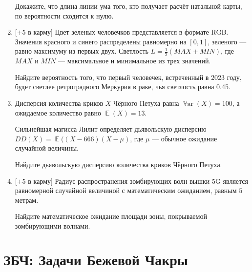 \documentclass[12pt]{article}
\DeclareMathOperator{\E}{\mathbb{E}}
\DeclareMathOperator{\Var}{\mathbb{V}ar}
\begin{document}
\begin{enumerate}
    Докажите, что  длина линии ума того, кто получает расчёт натальной карты, по вероятности сходится к нулю.
    
    
    \item  $[+$5 в карму] Цвет зеленых человечков представляется в формате RGB. 
    Значения красного и синего распределены равномерно на $[0,1]$, зеленого — равно максимуму из первых двух. Светлость $L = \frac 12 (MAX + MIN)$, где $MAX$ и $MIN$ — максимальное и минимальное из трех значений. 
    
    Найдите вероятность того, что первый человечек, встреченный в 2023 году, будет светлее рет\-рог\-рад\-ного Меркурия в раке, чья светлость равна 0.45.
    
    
    \item  
    Дисперсия количества криков $X$ Чёрного Петуха равна $\Var(X) = 100$, а ожидаемое количество равно $\E(X) = 13$.
    
    Сильнейшая магисса Лилит определяет дьявольскую дисперсию $DD(X) = \E((X - 666) (X-\mu)$, 
    где $\mu$ — обычное ожидание случайной величины. 
    
    Найдите дьявольскую дисперсию количества криков Чёрного Петуха. 
    
    
    
    
    \item  $[+$5 в карму] 
    Радиус распространения зомбирующих волн вышки 5G является равномерной слу\-чай\-ной величиной с математическим ожиданием, равным $5$ метрам. 
    
    Найдите математическое ожидание площади зоны, покрываемой зомбирующими волнами.



    
\end{enumerate}

\newpage

\section*{ЗБЧ: Задачи Бежевой Чакры}
\end{document}
